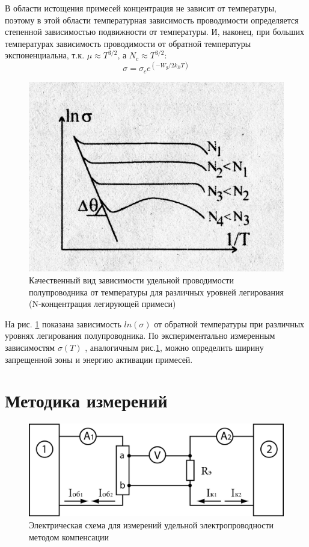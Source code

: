 В области истощения примесей концентрация не зависит от температуры, поэтому в этой области температурная зависимость проводимости определяется
степенной зависимостью подвижности от температуры. И, наконец, при больших температурах зависимость проводимости от
обратной температуры экспоненциальна, т.к. $\mu \approx T^{3/2}$, а  $N_c \approx T^{3/2}$:
 \begin{equation}
	\sigma=\sigma_{c} e^{\left(-W_{g} / 2 k_{B} T\right)}
	 \label{eq:4.4}
 \end{equation}
 \begin{figure}[h!]
	\centering
	\includegraphics[width = .5\linewidth]{img/41.jpg}
	\caption{Качественный вид зависимости удельной проводимости полупроводника от температуры для различных уровней легирования (N-концентрация легирующей примеси)}
	\label{fig:4.1}
\end{figure}
 
 На рис. \ref{fig:4.1} показана зависимость $ln(\sigma)$ от обратной температуры при различных уровнях легирования полупроводника. По
 экспериментально измеренным зависимостям $\sigma(T)$ , аналогичным рис.\ref{fig:4.1}, можно определить ширину запрещенной зоны и
 энергию активации примесей. 

\section{Методика измерений}

\begin{figure}[h!]
	\centering
	\includegraphics[width = .9\linewidth]{img/scheme.jpg}
	\caption{Электрическая схема для измерений удельной электропроводности методом компенсации}
	\label{fig:5.1}
\end{figure}

